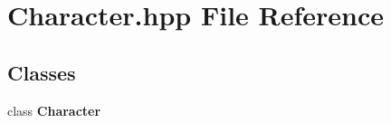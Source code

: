 \section{Character.\-hpp File Reference}
\label{_character_8hpp}
\subsection*{Classes}
\begin{DoxyCompactItemize}
\item 
class {\bf Character}
\end{DoxyCompactItemize}
